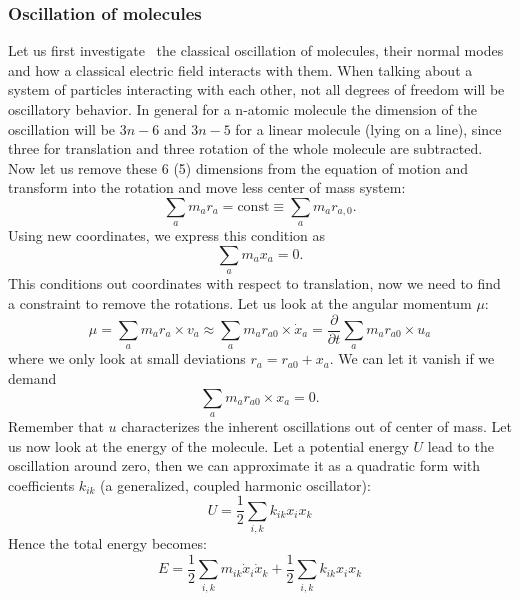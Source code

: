 \subsubsection{Oscillation of molecules}
\label{ssub:Oscillation_of_molecules}
Let us first investigate~\cite{landau1997mechanik} the classical oscillation of molecules, their normal modes and how a classical 
electric field interacts with them. When talking about a system of particles interacting with each other, not all degrees
of freedom will be oscillatory behavior. In general for a n-atomic molecule 
the dimension of the oscillation will be $3n - 6$ and $3n -5$ for a linear molecule (lying on a line), since three for
translation and three rotation of the whole molecule are subtracted. Now let us remove these 6 (5) dimensions from the
equation of motion and transform into the rotation and move less center of mass system:
\begin{equation}
    \sum_a m_a r_a = \mathrm{const} \equiv \sum_a m_a r_{a,0}.
\end{equation}
Using new coordinates, we express this condition as
\begin{equation}
    \sum_a m_a x_a = 0.
\end{equation}
This conditions out coordinates with respect to translation, now we need to find a constraint
to remove the rotations. Let us look at the angular momentum $\mu$: 
\begin{equation}
    \mu = \sum_a m_a r_a \times v_a \approx \sum_a m_a r_{a 0} \times \dot{x}_a = \frac{\partial}{\partial t}
    \sum_a m_a r_{a 0} \times u_a
\end{equation}
where we only look at small deviations $r_a = r_{a0} + x_a$. We can let it vanish if we demand
\begin{equation}
    \sum_a m_a r_{a0} \times x_a = 0.
\end{equation}
Remember that $u$ characterizes the inherent oscillations out of center of mass. Let us now
look at the energy of the molecule. Let a potential energy $U$ lead to the oscillation around zero,
then we can approximate it as a quadratic form with coefficients $k_{ik}$ (a generalized, coupled
harmonic oscillator):
\begin{equation}
    U = \frac{1}{2} \sum_{i,k} k_{ik} x_i x_k
\end{equation}
Hence the total energy becomes:
\begin{equation}
    E = \frac{1}{2} \sum_{i,k} m_{ik} \dot{x}_i\dot{x}_k + \frac{1}{2} \sum_{i,k} k_{ik} x_i x_k   
\end{equation}

